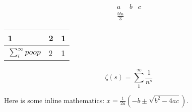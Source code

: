 \documentclass{article}
\begin{document}
\begin{align*}
a & b & c \\
\frac{bla}{3} & & 
\end{align*}

\begin{tabular}{|l|l|l|}\hline
1 & 2 & 1 \\ \hline
$\sum_i^\infty poop$ & 2 & 1 \hline
\end{tabular}

$$\zeta(s) = \sum_1^\infty \frac{1}{n^s}$$

Here is some inline mathematics: $x = \tfrac{1}{2a}(-b \pm \sqrt{b^2 - 4ac})$.
\end{document}

